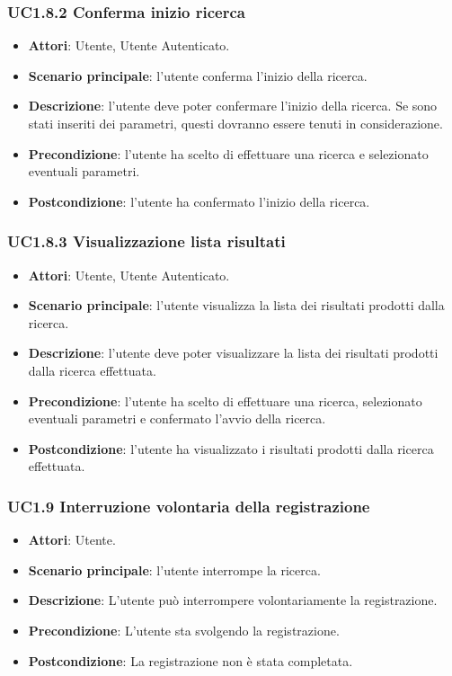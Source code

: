 \subsubsection{UC1.8.2 Conferma inizio ricerca}
\begin{itemize}
\item \textbf{Attori}: Utente, Utente Autenticato.
\item \textbf{Scenario principale}: l'utente conferma l'inizio della ricerca.
\item \textbf{Descrizione}: l'utente deve poter confermare l'inizio della ricerca. Se sono stati inseriti dei parametri, questi dovranno essere tenuti in considerazione.
\item \textbf{Precondizione}: l'utente ha scelto di effettuare una ricerca e selezionato eventuali parametri.
\item \textbf{Postcondizione}: l'utente ha confermato l'inizio della ricerca.
\end{itemize}
\subsubsection{UC1.8.3 Visualizzazione lista risultati}
\begin{itemize}
\item \textbf{Attori}: Utente, Utente Autenticato.
\item \textbf{Scenario principale}: l'utente visualizza la lista dei risultati prodotti dalla ricerca.
\item \textbf{Descrizione}: l'utente deve poter visualizzare la lista dei risultati prodotti dalla ricerca effettuata.
\item \textbf{Precondizione}: l'utente ha scelto di effettuare una ricerca, selezionato eventuali parametri e confermato l'avvio della ricerca.
\item \textbf{Postcondizione}: l'utente ha visualizzato i risultati prodotti dalla ricerca effettuata.
\end{itemize}
\subsubsection{UC1.9 Interruzione volontaria della registrazione}
\begin{itemize}
\item \textbf{Attori}: Utente.
\item \textbf{Scenario principale}: l'utente interrompe la ricerca.
\item \textbf{Descrizione}: L'utente può interrompere volontariamente la registrazione.
\item \textbf{Precondizione}: L'utente sta svolgendo la registrazione.
\item \textbf{Postcondizione}: La registrazione non è stata completata.
\end{itemize}
